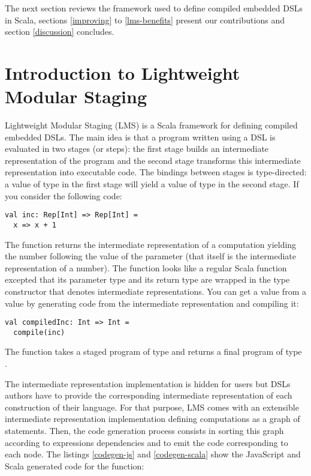 \documentclass[american,english,runningheads]{llncs}
\begin{document}
The next section reviews the framework used to define compiled embedded DSLs in Scala, sections \ref{improving} to \ref{lms-benefits} present our contributions and section \ref{discussion} concludes.


\section{Introduction to Lightweight Modular Staging}
\label{intro-lms}

Lightweight Modular Staging (LMS) is a Scala framework for defining compiled embedded DSLs. The main idea is that a program written using a DSL is evaluated in two stages (or steps): the first stage builds an intermediate representation of the program and the second stage transforms this intermediate representation into executable code. The bindings between stages is type-directed: a value of type  in the first stage will yield a value of type  in the second stage. If you consider the following code:
\begin{lstlisting}
val inc: Rep[Int] => Rep[Int] =
  x => x + 1
\end{lstlisting}
The  function returns the intermediate representation of a computation yielding the number following the value of the parameter  (that itself is the intermediate representation of a number). The function looks like a regular Scala function excepted that its parameter type and its return type are wrapped in the  type constructor that denotes intermediate representations. You can get a  value from a  value by generating code from the intermediate representation and compiling it:
\begin{lstlisting}
val compiledInc: Int => Int =
  compile(inc)
\end{lstlisting}
The  function takes a staged program of type  and returns a final program of type .

The intermediate representation implementation is hidden for users but DSLs authors have to provide the corresponding intermediate representation of each construction of their language. For that purpose, LMS comes with an extensible intermediate representation implementation defining computations as a graph of statements. Then, the code generation process consists in sorting this graph according to expressions dependencies and to emit the code corresponding to each node. The listings \ref{codegen-js} and \ref{codegen-scala} show the JavaScript and Scala generated code for the  function:
\begin{multicols}{2}


\end{multicols}
\end{document}
